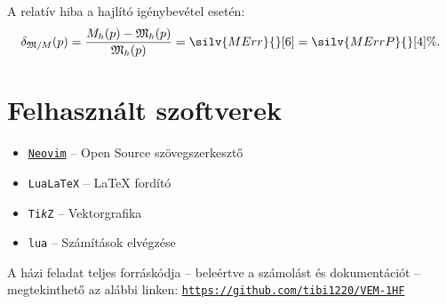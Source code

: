 \documentclass[a4paper, 12pt]{scrartcl}
\begin{document}
A relatív hiba a hajlító igénybevétel esetén:
\begin{equation}
  \delta_{\spec M/M}(p)
  = \frac{M_h(p) - \spec M_h(p)}{\spec M_h(p)}
  = \silv{MErr}{}[6]
  = \silv{MErrP}{}[4] \%
  \text.
  \label{eq:M-rel}
\end{equation}

\clearpage
\tableofcontents

\vfill

\section*{Felhasznált szoftverek}

\begin{itemize}
  \item \href{https://neovim.io}{\texttt{Neovim}}
        \tabto{3.9cm} – \tabto{4.7cm}
        Open Source szövegszerkesztő

  \item \texttt{Lua\LaTeX}
        \tabto{3.9cm} – \tabto{4.7cm}
        \LaTeX{} fordító

  \item \texttt{Ti\textit{k}Z}
        \tabto{3.9cm} – \tabto{4.7cm}
        Vektorgrafika

  \item \texttt{lua}
        \tabto{3.9cm} – \tabto{4.7cm}
        Számítások elvégzése
\end{itemize}

A házi feladat teljes forráskódja -- beleértve a számolást és dokumentációt --
megtekinthető az alábbi linken:
\texttt{\href{https://github.com/tibi1220/VEM-1HF}{https://github.com/tibi1220/VEM-1HF}}
\end{document}
